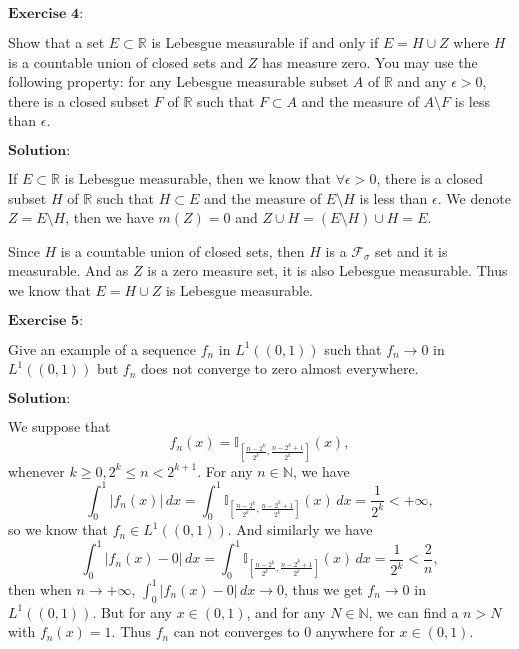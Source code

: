 \documentclass[12pt,a4paper]{ctexart}
\begin{document}
$\textbf{Exercise 4:}$

Show that a set $E \subset \mathbb{R}$ is Lebesgue measurable if and only if $E = H \cup Z$ where $H$ is a countable union of closed sets and $Z$ has measure zero. You may use the following property: for any Lebesgue measurable subset $A$ of $\mathbb{R}$ and any $\epsilon > 0$, there is a closed subset $F$ of $\mathbb{R}$ such that $F \subset A$ and the measure of $A \setminus F$ is less than $\epsilon$.

\vspace{8pt}
$\textbf{Solution:}$

If $E \subset \mathbb{R}$ is Lebesgue measurable, then we know that $\forall \epsilon > 0$, there is a closed subset $H$ of $\mathbb{R}$ such that $H \subset E$ and the measure of $E \setminus H$ is less than $\epsilon$. We denote $Z = E \setminus H$, then we have $m(Z) = 0$ and $Z \cup H = (E \setminus H) \cup H = E$. 

Since $H$ is a countable union of closed sets, then $H$ is a $\mathcal{F}_{\sigma}$ set and it is measurable. And as $Z$ is a zero measure set, it is also Lebesgue measurable. Thus we know that $E = H \cup Z$ is Lebesgue measurable.


$\textbf{Exercise 5:}$

Give an example of a sequence $f_{n}$ in $L^{1} ((0, 1))$ such that $f_{n} \to 0$ in $L^{1}((0, 1))$ but $f_{n}$ does not converge to zero almost everywhere.

\vspace{8pt}
$\textbf{Solution:}$

We suppose that
\begin{equation*}
    f_{n} (x) = \mathbb{I}_{[\frac{n - 2^{k}}{2^{k}}, \frac{n - 2^{k} + 1}{2^{k}}]} (x),
\end{equation*}
whenever $k \geq 0, 2^{k} \leq n < 2^{k + 1}$. For any $n \in \mathbb{N}$, we have
\begin{equation*}
    \int_{0}^{1} | f_{n} (x) | \, d x = \int_{0}^{1} \mathbb{I}_{[\frac{n - 2^{k}}{2^{k}}, \frac{n - 2^{k} + 1}{2^{k}}]} (x) \, d x  = \frac{1}{2^{k}} < +\infty,
\end{equation*}
so we know that $f_{n} \in L^{1}((0, 1))$. And similarly we have
\begin{equation*}
    \int_{0}^{1} | f_{n} (x) - 0 | \, d x = \int_{0}^{1} \mathbb{I}_{[\frac{n - 2^{k}}{2^{k}}, \frac{n - 2^{k} + 1}{2^{k}}]} (x) \, d x  = \frac{1}{2^{k}} < \frac{2}{n},
\end{equation*}
then when $n \to + \infty$, $\int_{0}^{1} | f_{n} (x) - 0 | \, d x \to 0$, thus we get $f_{n} \to 0$ in $L^{1}((0, 1))$. But for any $x \in (0, 1)$, and for any $N \in \mathbb{N}$, we can find a $n > N$ with $f_{n} (x) = 1$. Thus $f_{n}$ can not converges to $0$ anywhere for $x \in (0, 1)$.
\end{document}
